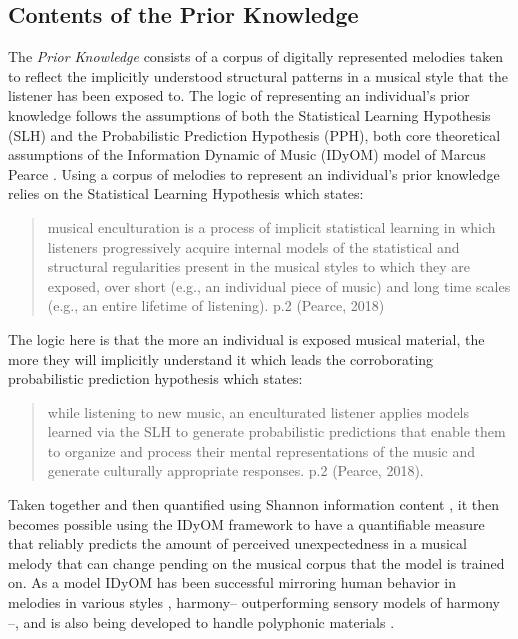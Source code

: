 \documentclass[]{book}
\begin{document}
\hypertarget{contents-of-the-prior-knowledge}{%
\subsection{Contents of the Prior Knowledge}\label{contents-of-the-prior-knowledge}}

The \emph{Prior Knowledge} consists of a corpus of digitally represented melodies taken to reflect the implicitly understood structural patterns in a musical style that the listener has been exposed to.
The logic of representing an individual's prior knowledge follows the assumptions of both the Statistical Learning Hypothesis (SLH) and the Probabilistic Prediction Hypothesis (PPH), both core theoretical assumptions of the Information Dynamic of Music (IDyOM) model of Marcus Pearce \citep{pearceConstructionEvaluationStatistical2005, pearceStatisticalLearningProbabilistic2018a}.
Using a corpus of melodies to represent an individual's prior knowledge relies on the Statistical Learning Hypothesis which states:

\begin{quote}
musical enculturation is a process of implicit statistical learning in which listeners progressively acquire internal models of the statistical and structural regularities present in the musical styles to which they are exposed, over short (e.g., an individual piece of music) and long time scales (e.g., an entire lifetime of listening). p.2 (Pearce, 2018)
\end{quote}

The logic here is that the more an individual is exposed musical material, the more they will implicitly understand it which leads the corroborating probabilistic prediction hypothesis which states:

\begin{quote}
while listening to new music, an enculturated listener applies models learned via the SLH to generate probabilistic predictions that enable them to organize and process their mental representations of the music and generate culturally appropriate responses. p.2 (Pearce, 2018).
\end{quote}

Taken together and then quantified using Shannon information content \citep{shannonMathematicalTheoryCommunication1948}, it then becomes possible using the IDyOM framework to have a quantifiable measure that reliably predicts the amount of perceived unexpectedness in a musical melody that can change pending on the musical corpus that the model is trained on.
As a model IDyOM has been successful mirroring human behavior in melodies in various styles \citep{pearceStatisticalLearningProbabilistic2018a}, harmony-- outperforming \citep{harrisonDissociatingSensoryCognitive2018} sensory models of harmony \citep{bigandEmpiricalEvidenceMusical2014}--, and is also being developed to handle polyphonic materials \citep{sauvePredictionPolyphonyModelling2017}.
\end{document}

